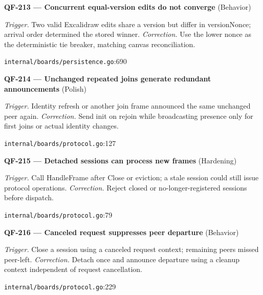\begin{minipage}{\linewidth}
\textbf{QF-213 --- Concurrent equal-version edits do not converge} {\scriptsize\color{accent}(Behavior)}\par
\textit{Trigger.} Two valid Excalidraw edits share a version but differ in versionNonce; arrival order determined the stored winner. \textit{Correction.} Use the lower nonce as the deterministic tie breaker, matching canvas reconciliation.\par
{\scriptsize\color{muted}\nolinkurl{internal/boards/persistence.go}:690}\par
\end{minipage}\par\vspace{7pt}
\begin{minipage}{\linewidth}
\textbf{QF-214 --- Unchanged repeated joins generate redundant announcements} {\scriptsize\color{accent}(Polish)}\par
\textit{Trigger.} Identity refresh or another join frame announced the same unchanged peer again. \textit{Correction.} Send init on rejoin while broadcasting presence only for first joins or actual identity changes.\par
{\scriptsize\color{muted}\nolinkurl{internal/boards/protocol.go}:127}\par
\end{minipage}\par\vspace{7pt}
\begin{minipage}{\linewidth}
\textbf{QF-215 --- Detached sessions can process new frames} {\scriptsize\color{accent}(Hardening)}\par
\textit{Trigger.} Call HandleFrame after Close or eviction; a stale session could still issue protocol operations. \textit{Correction.} Reject closed or no-longer-registered sessions before dispatch.\par
{\scriptsize\color{muted}\nolinkurl{internal/boards/protocol.go}:79}\par
\end{minipage}\par\vspace{7pt}
\begin{minipage}{\linewidth}
\textbf{QF-216 --- Canceled request suppresses peer departure} {\scriptsize\color{accent}(Behavior)}\par
\textit{Trigger.} Close a session using a canceled request context; remaining peers missed peer-left. \textit{Correction.} Detach once and announce departure using a cleanup context independent of request cancellation.\par
{\scriptsize\color{muted}\nolinkurl{internal/boards/protocol.go}:229}\par
\end{minipage}\par\vspace{7pt}
